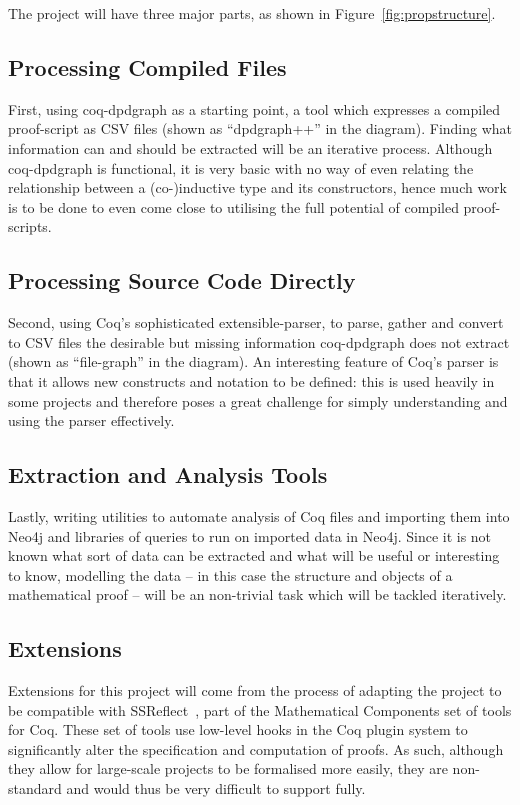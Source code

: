 \documentclass[12pt,a4paper]{article}
\begin{document}
The project will have three major parts, as shown in Figure~\ref{fig:propstructure}.

\subsection*{Processing Compiled Files}
First, using coq-dpdgraph as a starting point, a tool which expresses a
compiled proof-script as CSV files (shown as ``dpdgraph++'' in the diagram).
Finding what information can and should be extracted will be an iterative
process. Although coq-dpdgraph is functional, it is very basic with no way of
even relating the relationship between a (co-)inductive type and its
constructors, hence much work is to be done to even come close to utilising the
full potential of compiled proof-scripts.

\subsection*{Processing Source Code Directly}
Second, using Coq's sophisticated extensible-parser, to parse, gather and
convert to CSV files the desirable but missing information
coq-dpdgraph does not extract (shown as ``file-graph'' in the diagram). An
interesting feature of Coq's parser is that it allows new constructs and
notation to be defined: this is used heavily in some projects and therefore
poses a great challenge for simply understanding and using the parser
effectively.

\subsection*{Extraction and Analysis Tools}
Lastly, writing utilities to automate analysis of Coq files and importing them into
Neo4j and libraries of queries to run on imported data in Neo4j. Since it is not
known what sort of data can be extracted and what will be useful or interesting to
know, modelling the data -- in this case the structure and objects of a mathematical
proof -- will be an non-trivial task which will be tackled iteratively.

\subsection*{Extensions}

Extensions for this project will come from the process of adapting the project to
be compatible with SSReflect~\cite{gonthier2015ssr}, part of the Mathematical
Components set of tools for Coq. These set of tools use low-level hooks in the
Coq plugin system to significantly alter the specification and computation of
proofs. As such, although they allow for large-scale projects to be formalised
more easily, they are non-standard and would thus be very difficult to support
fully.
\end{document}
